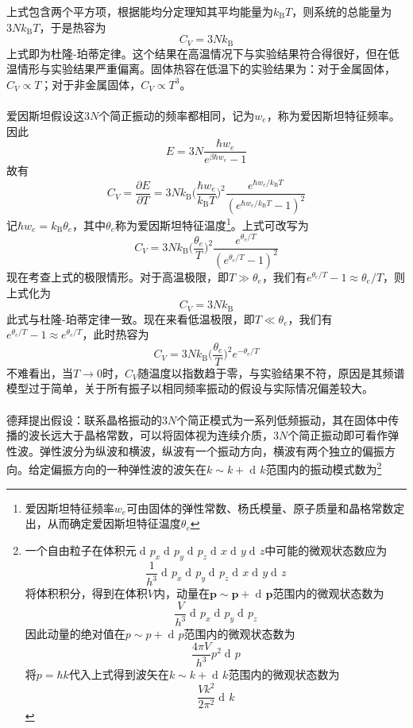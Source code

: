 \documentclass[UTF8,oneside,openany]{ctexbook}
\DeclareMathOperator\dif{d\!}
\newcommand\kb{k_{\text{B}}}
\begin{document}
上式包含两个平方项，根据能均分定理知其平均能量为$\kb T$，则系统的总能量为$3N\kb T$，于是热容为
\begin{equation}
C_V=3N\kb
\end{equation}
上式即为杜隆-珀蒂定律。这个结果在高温情况下与实验结果符合得很好，但在低温情形与实验结果严重偏离。固体热容在低温下的实验结果为：对于金属固体，$C_V\propto T$；对于非金属固体，$C_V\propto T^3$。
\\
\\
爱因斯坦假设这$3N$个简正振动的频率都相同，记为$w_e$，称为爱因斯坦特征频率。因此
\begin{equation}
E=3N\frac{\hbar w_e}{e^{\beta\hbar w_e}-1}
\end{equation}
故有
\begin{equation}
C_V=\frac{\partial E}{\partial T}=3N\kb\biggl(\frac{\hbar w_e}{\kb T}\biggr)^2\frac{e^{\hbar w_e/\kb T}}{(e^{\hbar w_e/\kb T}-1)^2}
\end{equation}
记$\hbar w_e=\kb\theta_e$，其中$\theta_e$称为爱因斯坦特征温度\footnote{爱因斯坦特征频率$w_e$可由固体的弹性常数、杨氏模量、原子质量和晶格常数定出，从而确定爱因斯坦特征温度$\theta_e$}。上式可改写为
\begin{equation}
C_V=3N\kb\biggl(\frac{\theta_e}{T}\biggr)^2\frac{e^{\theta_e/T}}{(e^{\theta_e/T}-1)^2}
\end{equation}
现在考查上式的极限情形。对于高温极限，即$T\gg\theta_e$，我们有$e^{\theta_e/T}-1\approx\theta_e/T$，则上式化为
\begin{equation}
C_V=3N\kb
\end{equation}
此式与杜隆-珀蒂定律一致。现在来看低温极限，即$T\ll\theta_e$，我们有$e^{\theta_e/T}-1\approx e^{\theta_e/T}$，此时热容为
\begin{equation}
C_V=3N\kb\biggl(\frac{\theta_e}{T}\biggr)^2e^{-\theta_e/T}
\end{equation}
不难看出，当$T\rightarrow0$时，$C_V$随温度以指数趋于零，与实验结果不符，原因是其频谱模型过于简单，关于所有振子以相同频率振动的假设与实际情况偏差较大。
\\
\\
德拜提出假设：联系晶格振动的$3N$个简正模式为一系列低频振动，其在固体中传播的波长远大于晶格常数，可以将固体视为连续介质，$3N$个简正振动即可看作弹性波。弹性波分为纵波和横波，纵波有一个振动方向，横波有两个独立的偏振方向。给定偏振方向的一种弹性波的波矢在$k\sim k+\dif k$范围内的振动模式数为\footnote{一个自由粒子在体积元$\dif p_x\dif p_y\dif p_z\dif x\dif y\dif z$中可能的微观状态数应为
\[\frac{1}{h^3}\dif p_x\dif p_y\dif p_z\dif x\dif y\dif z\]
将体积积分，得到在体积$V$内，动量在$\pmb{p}\sim\pmb{p}+\dif\pmb{p}$范围内的微观状态数为
\[\frac{V}{h^3}\dif p_x\dif p_y\dif p_z\]
因此动量的绝对值在$p\sim p+\dif p$范围内的微观状态数为
\[\frac{4\pi V}{h^3}p^2\dif p\]
将$p=\hbar k$代入上式得到波矢在$k\sim k+\dif k$范围内的微观状态数为
\[\frac{Vk^2}{2\pi^2}\dif k\]
}
\end{document}
